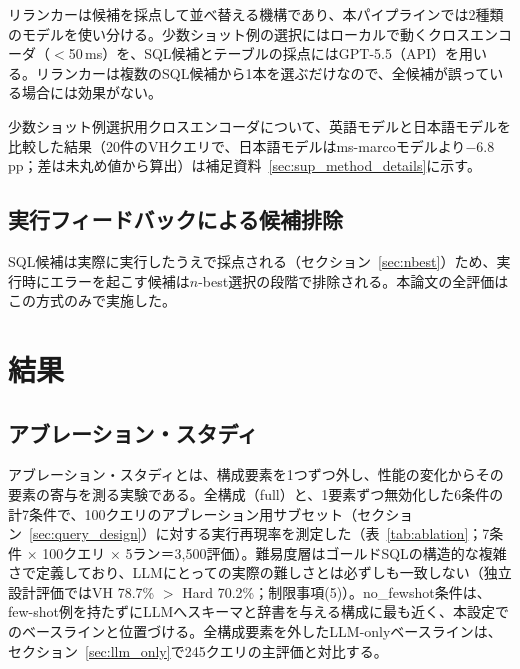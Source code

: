 \documentclass[twocolumn]{interact}
\begin{document}
リランカーは候補を採点して並べ替える機構であり、本パイプラインでは2種類のモデルを使い分ける。少数ショット例の選択にはローカルで動くクロスエンコーダ（$<$50\,ms）を、SQL候補とテーブルの採点にはGPT-5.5（API）を用いる。リランカーは複数のSQL候補から1本を選ぶだけなので、全候補が誤っている場合には効果がない。

少数ショット例選択用クロスエンコーダについて、英語モデルと日本語モデルを比較した結果（20件のVHクエリで、日本語モデルはms-marcoモデルより$-$6.8\,pp；差は未丸め値から算出）は補足資料~\ref{sec:sup_method_details}に示す。

\subsection{実行フィードバックによる候補排除}
\label{sec:repair}

SQL候補は実際に実行したうえで採点される（セクション~\ref{sec:nbest}）ため、実行時にエラーを起こす候補は$n$-best選択の段階で排除される。本論文の全評価はこの方式のみで実施した。
\section{結果}\label{sec:results}
\subsection{アブレーション・スタディ}\label{sec:ablation}

アブレーション・スタディとは、構成要素を1つずつ外し、性能の変化からその要素の寄与を測る実験である。全構成（full）と、1要素ずつ無効化した6条件の計7条件で、100クエリのアブレーション用サブセット（セクション~\ref{sec:query_design}）に対する実行再現率を測定した（表~\ref{tab:ablation}；7条件 $\times$ 100クエリ $\times$ 5ラン＝3{,}500評価）。難易度層はゴールドSQLの構造的な複雑さで定義しており、LLMにとっての実際の難しさとは必ずしも一致しない（独立設計評価ではVH 78.7\% $>$ Hard 70.2\%；制限事項(5)）。no\_fewshot条件は、few-shot例を持たずにLLMへスキーマと辞書を与える構成に最も近く、本設定でのベースラインと位置づける。全構成要素を外したLLM-onlyベースラインは、セクション~\ref{sec:llm_only}で245クエリの主評価と対比する。
\end{document}
